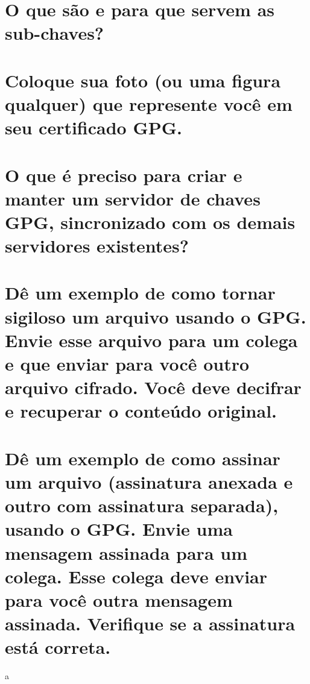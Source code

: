 \documentclass[
    article,            %
    11pt,               %
    oneside,            %
    a4paper,            %
    english,            %
    brazil,             %
    sumario=tradicional,
    ]{abntex2}
\begin{document}
\section{O que são e para que servem as sub-chaves?}


\section{Coloque sua foto (ou uma figura qualquer) que represente você em seu certificado GPG.}


\section{O que é preciso para criar e manter um servidor de chaves GPG, sincronizado com os demais servidores existentes?}


\section{Dê um exemplo de como tornar sigiloso um arquivo usando o GPG. Envie esse arquivo para um colega e que enviar para você outro arquivo cifrado. Você deve decifrar e recuperar o conteúdo original.}


\section{Dê um exemplo de como assinar um arquivo (assinatura anexada e outro com assinatura separada), usando o GPG. Envie uma mensagem assinada para um colega. Esse colega deve enviar para você outra mensagem assinada. Verifique se a assinatura está correta.}
a
% 


\postextual

\nocite{GnuPrivacyGuardHowto}

\end{document}
